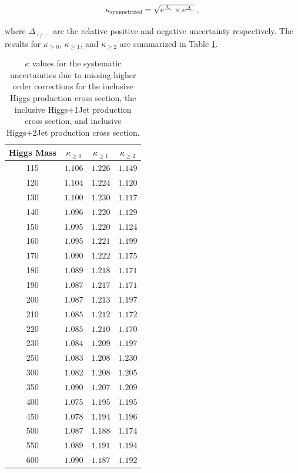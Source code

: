 \begin{eqnarray}
\label{eqn:kappaSymmetrization}
  \kappa_{\mathrm{symmetrized}} = \sqrt{e^{\Delta_{+}} \times e^{\Delta_{-}}} ,
\end{eqnarray}

where $\Delta_{\mathrm{+/-}}$ are the relative positive and negative uncertainty respectively.
The results for $\kappa_{\geq 0}$, $\kappa_{\geq 1}$, and $\kappa_{\geq 2}$ are summarized in Table 
\ref{tab:InclXS_ScaleVariation}.


\begin{table}[!htbp]
\begin{center}
\begin{tabular}{|c|c|c|c|}

\hline
Higgs Mass     &     $\kappa_{\geq 0}$        &   $\kappa_{\geq 1}$        &     $\kappa_{\geq 2}$       \\
\hline
 115 & $ 1.106$  & $ 1.226$  & $ 1.149$  \\
 120 & $ 1.104$  & $ 1.224$  & $ 1.120$  \\
 130 & $ 1.100$  & $ 1.230$  & $ 1.117$  \\
 140 & $ 1.096$  & $ 1.220$  & $ 1.129$  \\
 150 & $ 1.095$  & $ 1.220$  & $ 1.124$  \\
 160 & $ 1.095$  & $ 1.221$  & $ 1.199$  \\
 170 & $ 1.090$  & $ 1.222$  & $ 1.175$  \\
 180 & $ 1.089$  & $ 1.218$  & $ 1.171$  \\
 190 & $ 1.087$  & $ 1.217$  & $ 1.171$  \\
 200 & $ 1.087$  & $ 1.213$  & $ 1.197$  \\
 210 & $ 1.085$  & $ 1.212$  & $ 1.172$  \\
 220 & $ 1.085$  & $ 1.210$  & $ 1.170$  \\
 230 & $ 1.084$  & $ 1.209$  & $ 1.197$  \\
 250 & $ 1.083$  & $ 1.208$  & $ 1.230$  \\
 300 & $ 1.082$  & $ 1.208$  & $ 1.205$  \\
 350 & $ 1.090$  & $ 1.207$  & $ 1.209$  \\
 400 & $ 1.075$  & $ 1.195$  & $ 1.195$  \\
 450 & $ 1.078$  & $ 1.194$  & $ 1.196$  \\
 500 & $ 1.087$  & $ 1.188$  & $ 1.174$  \\
 550 & $ 1.089$  & $ 1.191$  & $ 1.194$  \\
 600 & $ 1.090$  & $ 1.187$  & $ 1.192$  \\

\hline
\end{tabular}
\caption{ $\kappa$ values for the systematic uncertainties due to missing higher order corrections
for the inclusive Higgs production cross section, the inclusive Higgs+1Jet production cross section, 
and inclusive Higgs+2Jet production cross section. }
\label{tab:InclXS_ScaleVariation}
\end{center}
\end{table}

